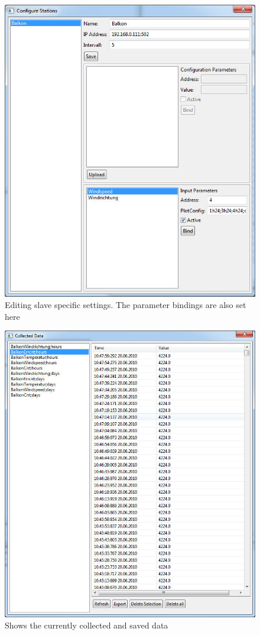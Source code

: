 \begin{figure}[p]
    \centering
    \includegraphics[width=0.8\linewidth]{master/slaves.jpg}
    \caption{Editing slave specific settings. The parameter bindings are also set here}
    \label{fig:slaves}
\end{figure}

\begin{figure}[p]
    \centering
    \includegraphics[width=0.8\linewidth]{master/viewdata.jpg}
    \caption{Shows the currently collected and saved data}
    \label{fig:data}
\end{figure}
\newpage
